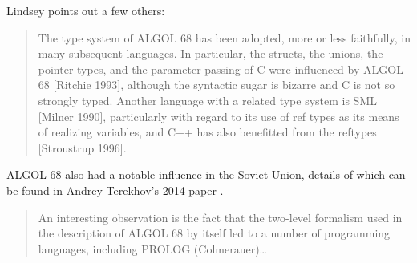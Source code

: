 Lindsey points out a few others:

\begin{quotation}
	The type system of ALGOL 68 has been adopted, more or less faithfully, in many subsequent
	languages. In particular, the structs, the unions, the pointer types, and the parameter passing of C
	were influenced by ALGOL 68 [Ritchie 1993], although the syntactic sugar is bizarre and C is not so
	strongly typed. Another language with a related type system is SML [Milner 1990], particularly with
	regard to its use of ref types as its means of realizing variables, and C++ has also benefitted from the
	reftypes [Stroustrup 1996].
\end{quotation}

ALGOL 68 also had a notable influence in the Soviet Union, details of which can
be found in Andrey Terekhov's 2014 paper .


\begin{quotation}
	An interesting observation is the fact that the two-level formalism used
	in the description of ALGOL 68 by itself led to a number of programming
	languages, including PROLOG (Colmerauer)\dots
	\cite{a_shorter_history_of_algol68_1994}
\end{quotation}
